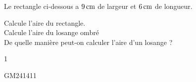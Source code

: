 \documentclass[a4paper,11pt]{report}
\let\oldcenter\center
\let\oldendcenter\endcenter
\renewenvironment{center}{\setlength\topsep{-10pt}\oldcenter}{\oldendcenter}
\begin{document}

\begin{exop}{
		Le rectangle ci-dessous a $\tunit{9}{cm}$ de largeur et $\tunit{6}{cm}$ de longueur.\\
\begin{center}
\end{center}
\begin{tasks}
    \task Calcule l'aire du rectangle. \smallskip \\ 
    \task Calcule l'aire du losange ombré \smallskip \\ 
    \task De quelle manière peut-on calculer l'aire d'un losange ? \smallskip \\ 
\end{tasks}
}{1} 
\end{exop}


\begin{exol}{GM24}{141}{1}      %
\end{exol}
\end{document}
